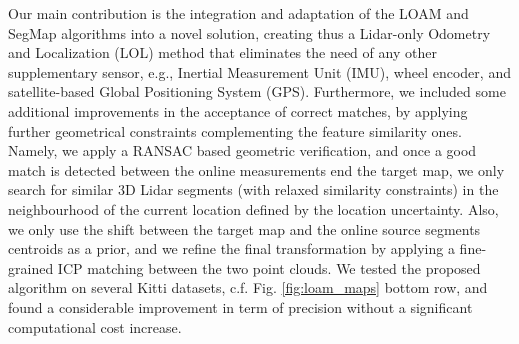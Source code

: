 \documentclass[letterpaper, 10 pt, conference]{ieeeconf}  %
\begin{document}
Our main contribution is the integration and adaptation of the LOAM and SegMap algorithms into a novel solution, creating thus a Lidar-only Odometry and Localization (LOL) method that eliminates the need of any other supplementary sensor, e.g., Inertial Measurement Unit (IMU), wheel encoder, and satellite-based Global Positioning System (GPS). Furthermore, we included some additional improvements in the acceptance of correct matches, by applying further geometrical constraints complementing the feature similarity ones. Namely, we apply a RANSAC based geometric verification, and once a good match is detected between the online measurements end the target map, we only search for similar 3D Lidar segments (with relaxed similarity constraints) in the neighbourhood of the current location defined by the location uncertainty. Also, we only use the shift between the target map and the online source segments centroids as a prior, and we refine the final transformation by applying a fine-grained ICP matching between the two point clouds. We tested the proposed algorithm on several Kitti datasets, c.f. Fig. \ref{fig:loam_maps} bottom row, and found a considerable improvement in term of precision without a significant computational cost increase. 
\end{document}
